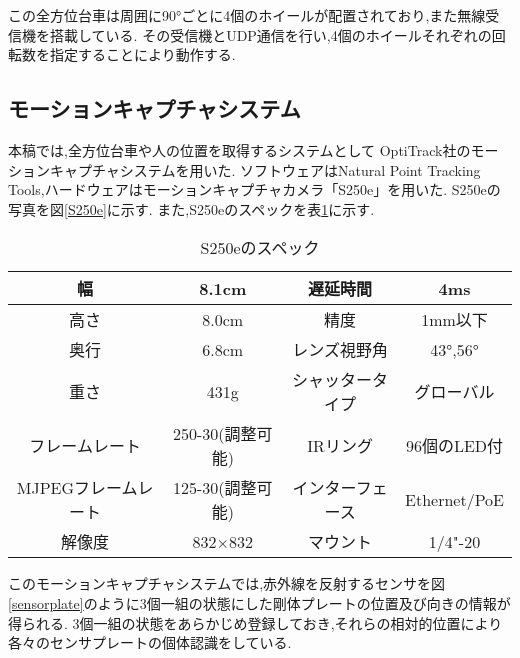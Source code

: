 この全方位台車は周囲に90°ごとに4個のホイールが配置されており,また無線受信機を搭載している.
その受信機とUDP通信を行い,4個のホイールそれぞれの回転数を指定することにより動作する.


\subsection{モーションキャプチャシステム}
本稿では,全方位台車や人の位置を取得するシステムとして
OptiTrack社のモーションキャプチャシステムを用いた.
ソフトウェアはNatural Point Tracking Tools,ハードウェアはモーションキャプチャカメラ「S250e」を用いた.
S250eの写真を図\ref{S250e}に示す.
また,S250eのスペックを表\ref{S250espec}に示す.

\begin{comment}
\begin{figure}[!h]
\begin{center}

\texttt{[image: S250e.eps]}
\caption{モーションキャプチャカメラ「S250e」}
\label{S250e}
\end{center}
\end{figure}
\end{comment}


\begin{table}

\begin{center}
\begin{tabular}{|c|c|c|c|}


\hline
幅 & 8.1cm & 遅延時間 & 4ms \\
\hline
高さ & 8.0cm & 精度 & 1mm以下 \\
\hline
奥行 & 6.8cm & レンズ視野角 & 43°,56° \\
\hline
重さ & 431g & シャッタータイプ & グローバル\\
\hline
フレームレート & 250-30(調整可能) & IRリング & 96個のLED付 \\
\hline
MJPEGフレームレート & 125-30(調整可能) & インターフェース & Ethernet/PoE \\
\hline
解像度 & 832×832 & マウント & 1/4"-20 \\
\hline
\end{tabular}
\end{center}

\caption{S250eのスペック}
\label{S250espec}
\end{table}

このモーションキャプチャシステムでは,赤外線を反射するセンサを図\ref{sensorplate}のように3個一組の状態にした剛体プレートの位置及び向きの情報が得られる.
3個一組の状態をあらかじめ登録しておき,それらの相対的位置により各々のセンサプレートの個体認識をしている.

